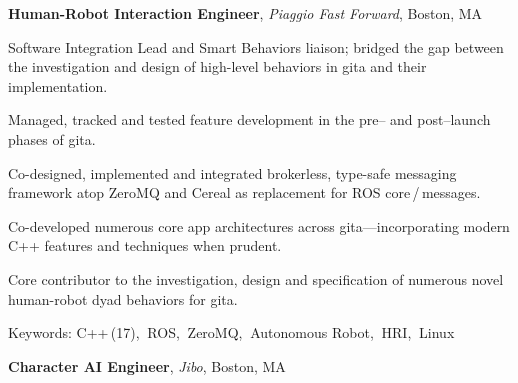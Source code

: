 \documentclass[10pt, letter]{article}
\newcommand{\years}[1]{\marginnote{\footnotesize #1}}
\newenvironment{desc*}{
  \begin{description}
    \setlength{\itemsep}{0.2pt}
    \setlength{\parskip}{-1pt}
    \setlength{\parsep}{0pt}
  }{
  \end{description}
}
\begin{document}
\years{2018 -- 2020} 
\textbf{Human-Robot Interaction Engineer},
\textit{Piaggio Fast Forward}, Boston, MA\bigskip

Software Integration Lead and Smart Behaviors liaison; bridged the gap between the investigation and
design of high-level behaviors in gita and their implementation.
\begin{itemize}[leftmargin=*, rightmargin=1.5cm]
  {\light
\item Managed, tracked and tested feature development in the pre-- and post--launch phases of gita.
\item Co-designed, implemented and integrated brokerless, type-safe messaging framework
  atop ZeroMQ and Cereal as replacement for ROS core\,/\,messages.
\item Co-developed numerous core app architectures across gita---incorporating modern C++
  features and techniques when prudent.
\item Core contributor to the investigation, design and specification of numerous novel
  human-robot dyad behaviors for gita.
  }
\end{itemize}
\begin{desc*}
\item[\rm \color{redblue} Keywords:] C++\,(17),$\:$ ROS,$\:$ ZeroMQ,$\:$ Autonomous Robot,$\:$ HRI,$\:$ Linux \bigbreak
\end{desc*}

\years{2016 -- 2018} 
\textbf{Character AI Engineer},
\textit{Jibo}, Boston, MA\bigskip
\end{document}
